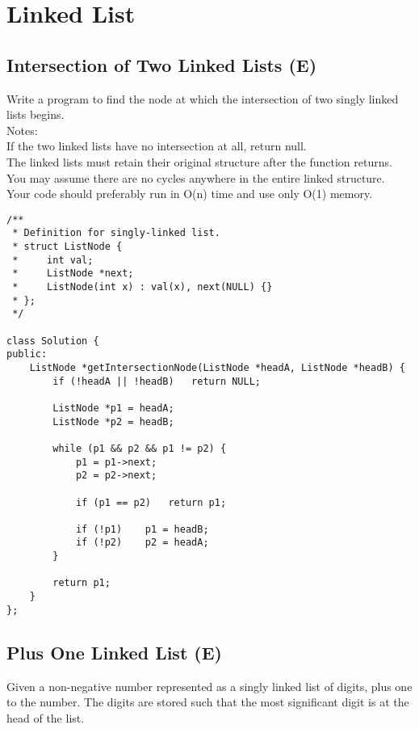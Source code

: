 \chapter{Linked List}
\section{Intersection of Two Linked Lists (E)}
Write a program to find the node at which the intersection of two singly linked lists begins.\\

Notes:\\
    If the two linked lists have no intersection at all, return null.\\
    The linked lists must retain their original structure after the function returns.\\
    You may assume there are no cycles anywhere in the entire linked structure.\\
    Your code should preferably run in O(n) time and use only O(1) memory.\\
 
\begin{lstlisting}
/**
 * Definition for singly-linked list.
 * struct ListNode {
 *     int val;
 *     ListNode *next;
 *     ListNode(int x) : val(x), next(NULL) {}
 * };
 */
 
class Solution {
public:
    ListNode *getIntersectionNode(ListNode *headA, ListNode *headB) {
        if (!headA || !headB)   return NULL;
        
        ListNode *p1 = headA;
        ListNode *p2 = headB;
        
        while (p1 && p2 && p1 != p2) {
            p1 = p1->next;
            p2 = p2->next;
            
            if (p1 == p2)   return p1;
            
            if (!p1)    p1 = headB;
            if (!p2)    p2 = headA;
        }
        
        return p1;
    }
};
\end{lstlisting}


\section{Plus One Linked List (E)}
Given a non-negative number represented as a singly linked list of digits, plus one to the number. The digits are stored such that the most significant digit is at the head of the list.\\

